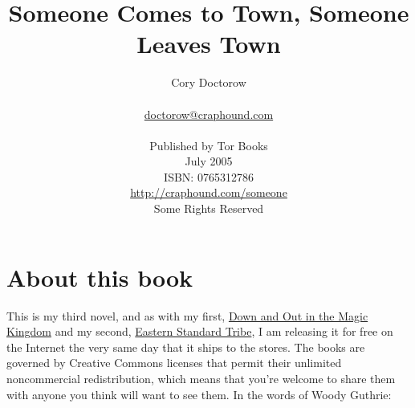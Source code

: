 %
%
%
%
%



\newcommand{\mylettrine}[2]{{\vskip \baselineskip} \noindent\textsc{#1#2}}




\title{\Huge Someone Comes to Town, Someone Leaves Town}
\author
{
	{\Large Cory Doctorow} \\ \\
	\href{mailto:doctorow@craphound.com}{doctorow@craphound.com} \\ \\
	Published by Tor Books \\
	July 2005 \\
	ISBN:  0765312786 \\
	\href{http://craphound.com/someone}{http://craphound.com/someone} \\
	Some Rights Reserved \\
}
\date{}
\maketitle
\thispagestyle{empty}

\newpage



\section{About this book}
This is my third novel, and as with my first, 
\href{http://craphound.com/down}{Down and Out in the Magic Kingdom}
and my second, \href{http://craphound.com/est}{Eastern Standard
Tribe}, I am releasing it for free on the Internet the very same
day that it ships to the stores.  The books are governed by Creative
Commons licenses that permit their unlimited noncommercial
redistribution, which means that you're welcome to share them with
anyone you think will want to see them.  In the words of Woody
Guthrie: 


